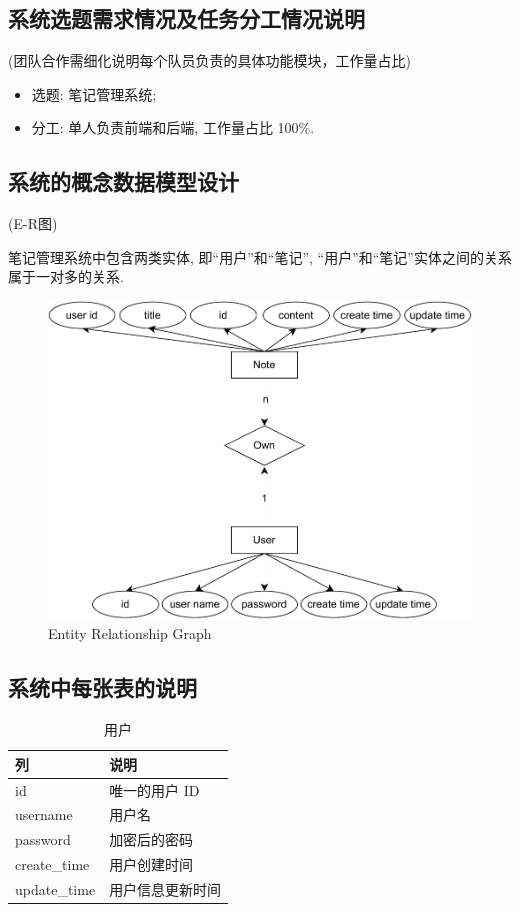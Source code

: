 \subsection{系统选题需求情况及任务分工情况说明}
(团队合作需细化说明每个队员负责的具体功能模块，工作量占比)

\begin{itemize}
  \item 选题: 笔记管理系统;
  \item 分工: 单人负责前端和后端, 工作量占比 100\%.
\end{itemize}

\subsection{系统的概念数据模型设计}
(E-R图)

笔记管理系统中包含两类实体, 即``用户''和``笔记'', ``用户''和``笔记''实体之间的关系属于一对多的关系.

\begin{figure}[H]
  \begin{center}
    \includegraphics[page=1,scale=0.45]{./resources/er.pdf}
  \end{center}
  \caption{Entity Relationship Graph}
\end{figure}

\subsection{系统中每张表的说明}
\begin{table}[H]
  \caption{用户}
  \begin{center}
    \begin{tabular}[c]{ll}
      \hline
      列 & 说明 \\
      \hline
      id & 唯一的用户 ID \\
      username & 用户名 \\
      password & 加密后的密码 \\
      create\_time & 用户创建时间 \\
      update\_time & 用户信息更新时间 \\
      \hline
    \end{tabular}
  \end{center}
\end{table}

